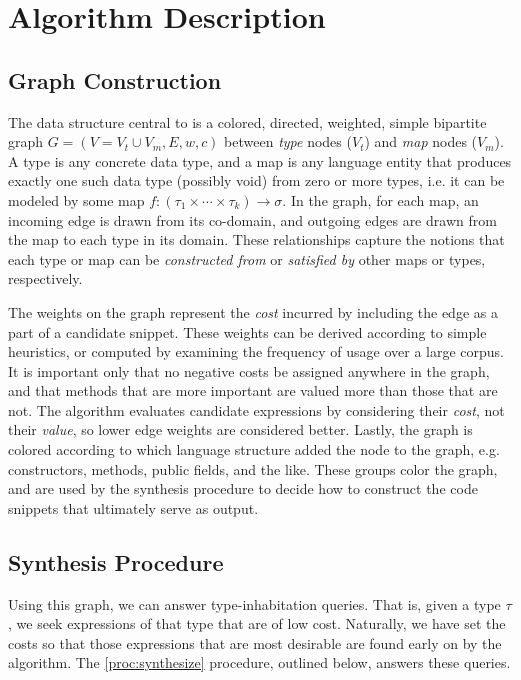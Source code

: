 \clearpage

\section{Algorithm Description}
\subsection{Graph Construction}

The data structure central to \ourTool is a colored, directed, weighted, simple bipartite graph $G = (V = V_t \cup V_m, E, w, c)$ between \textit{type} nodes ($V_t$) and \textit{map} nodes ($V_m$). A type is any concrete data type, and a map is any language entity that produces exactly one such data type (possibly void) from zero or more types, i.e. it can be modeled by some map $f : (\tau_1 \times \cdots \times \tau_k) \to \sigma$. In the graph, for each map, an incoming edge is drawn from its co-domain, and outgoing edges are drawn from the map to each type in its domain. These relationships capture the notions that each type or map can be \textit{constructed from} or \textit{satisfied by} other maps or types, respectively.

The weights on the graph represent the \textit{cost} incurred by including the edge as a part of a candidate snippet. These weights can be derived according to simple heuristics, or computed by examining the frequency of usage over a large corpus. It is important only that no negative costs be assigned anywhere in the graph, and that methods that are more important are valued more than those that are not. The algorithm evaluates candidate expressions by considering their \textit{cost}, not their \textit{value}, so lower edge weights are considered better. Lastly, the graph is colored according to which language structure added the node to the graph, e.g. constructors, methods, public fields, and the like. These groups color the graph, and are used by the synthesis procedure to decide how to construct the code snippets that ultimately serve as output.

\subsection{Synthesis Procedure}

Using this graph, we can answer type-inhabitation queries. That is, given a type $\tau$, we seek expressions of that type that are of low cost. Naturally, we have set the costs so that those expressions that are most desirable are found early on by the algorithm. The \ref{proc:synthesize} procedure, outlined below, answers these queries.

